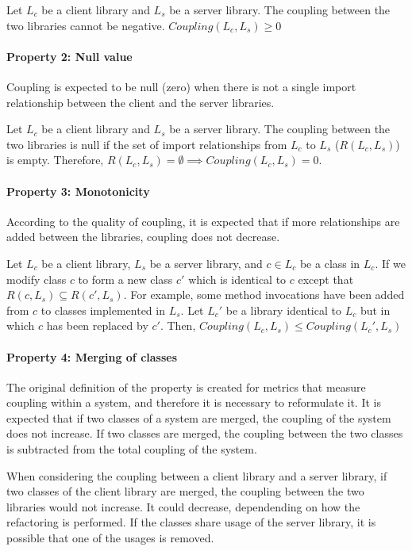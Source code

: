Let $L_c$ be a client library and $L_s$ be a server library. The coupling between the two libraries cannot be negative. $Coupling(L_c, L_s) \ge 0$

\paragraph{Property 2: Null value}
Coupling is expected to be null (zero) when there is not a single import relationship between the client and the server libraries.

Let $L_c$ be a client library and $L_s$ be a server library. The coupling between the two libraries is null if the set of import relationships from $L_c$ to $L_s$ ($R(L_c, L_s)$) is empty. Therefore, $R(L_c, L_s) = \emptyset \implies Coupling(L_c, L_s) = 0$.

\paragraph{Property 3: Monotonicity}
According to the quality of coupling, it is expected that if more relationships are added between the libraries, coupling does not decrease.

Let $L_c$ be a client library, $L_s$ be a server library, and $c \in L_c$ be a class in $L_c$. If we modify class $c$ to form a new class $c'$ which is identical to $c$ except that $R(c, L_s) \subseteq R(c', L_s)$. For example, some method invocations have been added from $c$ to classes implemented in $L_s$. Let $L_c'$ be a library identical to $L_c$ but in which $c$ has been replaced by $c'$. Then, $Coupling(L_c, L_s) \le Coupling(L_c', L_s)$

\paragraph{Property 4: Merging of classes}
The original definition of the property is created for metrics that measure coupling within a system, and therefore it is necessary to reformulate it. It is expected that if two classes of a system are merged, the coupling of the system does not increase. If two classes are merged, the coupling between the two classes is subtracted from the total coupling of the system.

When considering the coupling between a client library and a server library, if two classes of the client library are merged, the coupling between the two libraries would not increase. It could decrease, dependending on how the refactoring is performed. If the classes share usage of the server library, it is possible that one of the usages is removed.

